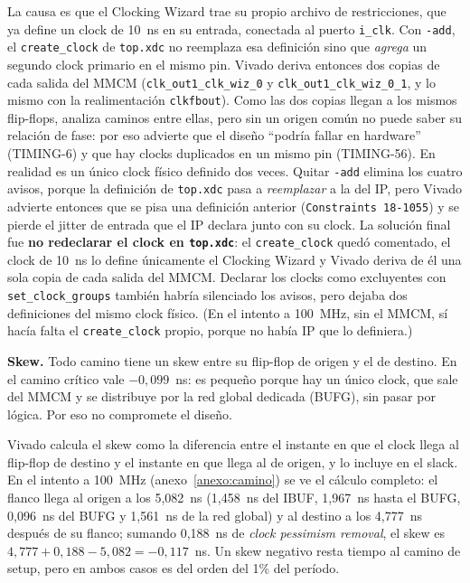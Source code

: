 \documentclass[12pt,a4paper]{article}
\begin{document}
La causa es que el Clocking Wizard trae su propio archivo de restricciones,
que ya define un clock de 10~ns en su entrada, conectada al puerto
\texttt{i\_clk}. Con \texttt{-add}, el \texttt{create\_clock} de
\texttt{top.xdc} no reemplaza esa definición sino que \emph{agrega} un segundo
clock primario en el mismo pin. Vivado deriva entonces dos copias de cada salida
del MMCM (\texttt{clk\_out1\_clk\_wiz\_0} y \texttt{clk\_out1\_clk\_wiz\_0\_1}, y lo
mismo con la realimentación \texttt{clkfbout}). Como las dos copias llegan a los
mismos flip-flops, analiza caminos entre ellas, pero sin un origen común no
puede saber su relación de fase: por eso advierte que el diseño ``podría fallar
en hardware'' (TIMING-6) y que hay clocks duplicados en un mismo pin
(TIMING-56). En realidad es un único clock físico definido dos veces. Quitar
\texttt{-add} elimina los cuatro avisos, porque la definición de
\texttt{top.xdc} pasa a \emph{reemplazar} a la del IP, pero Vivado advierte
entonces que se pisa una definición anterior (\texttt{Constraints 18-1055}) y
se pierde el jitter de entrada que el IP declara junto con su clock. La
solución final fue \textbf{no redeclarar el clock en \texttt{top.xdc}}: el
\texttt{create\_clock} quedó comentado, el clock de 10~ns lo define únicamente
el Clocking Wizard y Vivado deriva de él una sola copia de cada salida del MMCM.
Declarar los clocks como excluyentes con \texttt{set\_clock\_groups} también
habría silenciado los avisos, pero dejaba dos definiciones del mismo clock
físico. (En el intento a 100~MHz, sin el MMCM, sí hacía falta el
\texttt{create\_clock} propio, porque no había IP que lo definiera.)

\textbf{Skew.} Todo camino tiene un skew entre su flip-flop de origen y el de
destino. En el camino crítico vale $-0{,}099$~ns: es pequeño porque hay un único
clock, que sale del MMCM y se distribuye por la red global dedicada (BUFG), sin
pasar por lógica. Por eso no compromete el diseño.

Vivado calcula el skew como la diferencia entre el instante en que el clock
llega al flip-flop de destino y el instante en que llega al de origen, y lo
incluye en el slack. En el intento a 100~MHz (anexo~\ref{anexo:camino}) se ve el
cálculo completo: el flanco llega al origen a los 5,082~ns (1,458~ns del IBUF,
1,967~ns hasta el BUFG, 0,096~ns del BUFG y 1,561~ns de la red global) y al
destino a los 4,777~ns después de su flanco; sumando 0,188~ns de
\emph{clock pessimism removal}, el skew es
$4{,}777 + 0{,}188 - 5{,}082 = -0{,}117$~ns. Un skew negativo resta tiempo al
camino de setup, pero en ambos casos es del orden del 1\% del período.
\end{document}
